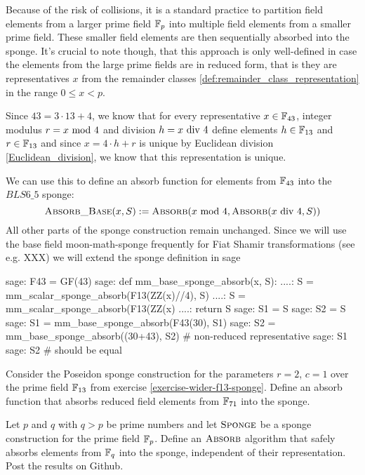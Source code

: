 Because of the risk of collisions, it is a standard practice to partition field elements from a larger prime field $\mathbb{F}_p$ into multiple field elements from a smaller prime field. These smaller field elements are then sequentially absorbed into the sponge. It's crucial to note though, that this approach is only well-defined in case the elements from the large prime fields are in reduced form, that is they are representatives $x$ from the remainder classes \ref{def:remainder_class_representation} in the range $0\leq x < p$. 

Since $43 = 3\cdot 13 +4$, we know that for every  representative $x\in \mathbb{F}_{43}$, integer modulus $r=x \text{ mod } 4$ and division $h=x \text{ div } 4$ define elements $h\in \mathbb{F}_{13}$ and $r\in \mathbb{F}_{13}$ and since $x=4\cdot h + r$ is unique by Euclidean division \ref{Euclidean_division}, we know that this representation is unique. 

We can use this to define an absorb function for elements from $\mathbb{F}_{43}$ into the $BLS6\_5$ sponge:
\begin{equation}
\label{bls-6-base-sponge}
\textsc{Absorb\_Base}(x,S):= \textsc{Absorb}(x \text{ mod } 4,\textsc{Absorb}(x \text{ div } 4,S))
\end{equation}
All other parts of the sponge construction remain unchanged. Since we will use the base field moon-math-sponge frequently for Fiat Shamir transformations (see e.g. XXX) we will extend the sponge definition in sage
\begin{sagecommandline}
sage: F43 = GF(43)
sage: def mm_base_sponge_absorb(x, S):
....:     S = mm_scalar_sponge_absorb(F13(ZZ(x)//4), S)
....:     S = mm_scalar_sponge_absorb(F13(ZZ(x)%
....:     return S
sage: S1 = S
sage: S2 = S
sage: S1 = mm_base_sponge_absorb(F43(30), S1)
sage: S2 = mm_base_sponge_absorb((30+43), S2) # non-reduced representative
sage: S1
sage: S2 # should be equal
\end{sagecommandline}
\begin{exercise}
Consider the Poseidon sponge construction for the parameters $r=2$, $c=1$ over the prime field $\mathbb{F}_{13}$ from exercise \ref{exercise-wider-f13-sponge}. Define an absorb function that absorbs reduced field elements from $\mathbb{F}_{71}$ into the sponge.
\end{exercise} 
\begin{exercise}
Let $p$ and $q$ with $q>p$ be prime numbers and let $\textsc{Sponge}$ be a sponge construction for the prime field $\mathbb{F}_p$. Define an $\textsc{Absorb}$ algorithm that safely absorbs elements from $\mathbb{F}_q$ into the sponge, independent of their representation. Post the results on Github.
\end{exercise}
